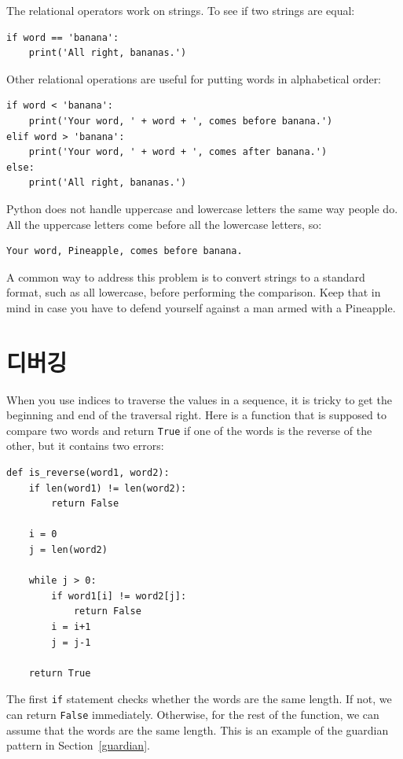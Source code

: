 \documentclass[10pt]{book}
\begin{document}
The relational operators work on strings.  To see if two strings are equal:

\begin{verbatim}
if word == 'banana':
    print('All right, bananas.')
\end{verbatim}
%
Other relational operations are useful for putting words in alphabetical
order:

\begin{verbatim}
if word < 'banana':
    print('Your word, ' + word + ', comes before banana.')
elif word > 'banana':
    print('Your word, ' + word + ', comes after banana.')
else:
    print('All right, bananas.')
\end{verbatim}
%
Python does not handle uppercase and lowercase letters the same way
people do.  All the uppercase letters come before all the
lowercase letters, so:

\begin{verbatim}
Your word, Pineapple, comes before banana.
\end{verbatim}
%
A common way to address this problem is to convert strings to a
standard format, such as all lowercase, before performing the
comparison.  Keep that in mind in case you have to defend yourself
against a man armed with a Pineapple.


\section{디버깅}

When you use indices to traverse the values in a sequence,
it is tricky to get the beginning and end of the traversal
right.  Here is a function that is supposed to compare two
words and return {\tt True} if one of the words is the reverse
of the other, but it contains two errors:

\begin{verbatim}
def is_reverse(word1, word2):
    if len(word1) != len(word2):
        return False
    
    i = 0
    j = len(word2)

    while j > 0:
        if word1[i] != word2[j]:
            return False
        i = i+1
        j = j-1

    return True
\end{verbatim}
%
The first {\tt if} statement checks whether the words are the
same length.  If not, we can return {\tt False} immediately.
Otherwise, for the rest of the function, we can assume that the words
are the same length.  This is an example of the guardian pattern
in Section~\ref{guardian}.
\end{document}
